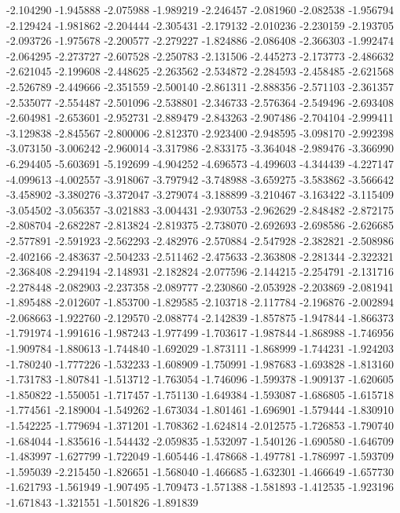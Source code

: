 -2.104290
-1.945888
-2.075988
-1.989219
-2.246457
-2.081960
-2.082538
-1.956794
-2.129424
-1.981862
-2.204444
-2.305431
-2.179132
-2.010236
-2.230159
-2.193705
-2.093726
-1.975678
-2.200577
-2.279227
-1.824886
-2.086408
-2.366303
-1.992474
-2.064295
-2.273727
-2.607528
-2.250783
-2.131506
-2.445273
-2.173773
-2.486632
-2.621045
-2.199608
-2.448625
-2.263562
-2.534872
-2.284593
-2.458485
-2.621568
-2.526789
-2.449666
-2.351559
-2.500140
-2.861311
-2.888356
-2.571103
-2.361357
-2.535077
-2.554487
-2.501096
-2.538801
-2.346733
-2.576364
-2.549496
-2.693408
-2.604981
-2.653601
-2.952731
-2.889479
-2.843263
-2.907486
-2.704104
-2.999411
-3.129838
-2.845567
-2.800006
-2.812370
-2.923400
-2.948595
-3.098170
-2.992398
-3.073150
-3.006242
-2.960014
-3.317986
-2.833175
-3.364048
-2.989476
-3.366990
-6.294405
-5.603691
-5.192699
-4.904252
-4.696573
-4.499603
-4.344439
-4.227147
-4.099613
-4.002557
-3.918067
-3.797942
-3.748988
-3.659275
-3.583862
-3.566642
-3.458902
-3.380276
-3.372047
-3.279074
-3.188899
-3.210467
-3.163422
-3.115409
-3.054502
-3.056357
-3.021883
-3.004431
-2.930753
-2.962629
-2.848482
-2.872175
-2.808704
-2.682287
-2.813824
-2.819375
-2.738070
-2.692693
-2.698586
-2.626685
-2.577891
-2.591923
-2.562293
-2.482976
-2.570884
-2.547928
-2.382821
-2.508986
-2.402166
-2.483637
-2.504233
-2.511462
-2.475633
-2.363808
-2.281344
-2.322321
-2.368408
-2.294194
-2.148931
-2.182824
-2.077596
-2.144215
-2.254791
-2.131716
-2.278448
-2.082903
-2.237358
-2.089777
-2.230860
-2.053928
-2.203869
-2.081941
-1.895488
-2.012607
-1.853700
-1.829585
-2.103718
-2.117784
-2.196876
-2.002894
-2.068663
-1.922760
-2.129570
-2.088774
-2.142839
-1.857875
-1.947844
-1.866373
-1.791974
-1.991616
-1.987243
-1.977499
-1.703617
-1.987844
-1.868988
-1.746956
-1.909784
-1.880613
-1.744840
-1.692029
-1.873111
-1.868999
-1.744231
-1.924203
-1.780240
-1.777226
-1.532233
-1.608909
-1.750991
-1.987683
-1.693828
-1.813160
-1.731783
-1.807841
-1.513712
-1.763054
-1.746096
-1.599378
-1.909137
-1.620605
-1.850822
-1.550051
-1.717457
-1.751130
-1.649384
-1.593087
-1.686805
-1.615718
-1.774561
-2.189004
-1.549262
-1.673034
-1.801461
-1.696901
-1.579444
-1.830910
-1.542225
-1.779694
-1.371201
-1.708362
-1.624814
-2.012575
-1.726853
-1.790740
-1.684044
-1.835616
-1.544432
-2.059835
-1.532097
-1.540126
-1.690580
-1.646709
-1.483997
-1.627799
-1.722049
-1.605446
-1.478668
-1.497781
-1.786997
-1.593709
-1.595039
-2.215450
-1.826651
-1.568040
-1.466685
-1.632301
-1.466649
-1.657730
-1.621793
-1.561949
-1.907495
-1.709473
-1.571388
-1.581893
-1.412535
-1.923196
-1.671843
-1.321551
-1.501826
-1.891839
